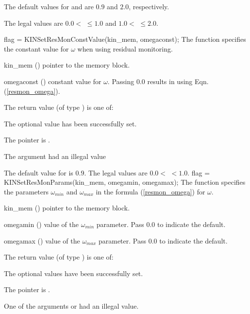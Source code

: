 {
  The default values for  and  are $0.9$ and $2.0$, respectively.

  The legal values are $0.0 <$  $\le 1.0$ and
  $1.0<$  $\le 2.0$.
}
{
flag = KINSetResMonConstValue(kin\_mem, omegaconst);
}
{
  The function  specifies the constant value
  for $\omega$ when using residual monitoring.
}
{
  \begin{args}
  \item[kin\_mem] ()
    pointer to the {\kinsol} memory block.
  \item[omegaconst] ()
    constant value for $\omega$.  Passing $0.0$ results in using
    Eqn. (\ref{resmon_omega}).
  \end{args}
}
{
  The return value  (of type ) is one of:
  \begin{args}
  \item[\Id{KIN\_SUCCESS}]
    The optional value has been successfully set.
  \item[\Id{KIN\_MEM\_NULL}]
    The  pointer is .
  \item[\Id{KIN\_ILL\_INPUT}]
    The argument  had an illegal value
  \end{args}
}
{
  The default value for  is $0.9$.
  The legal values are $0.0 <$  $< 1.0$.
}
{
flag = KINSetResMonParams(kin\_mem, omegamin, omegamax);
}
{
  The function  specifies the parameters $\omega_{min}$ and
  $\omega_{max}$ in the formula (\ref{resmon_omega}) for $\omega$.
}
{
  \begin{args}
  \item[kin\_mem] ()
    pointer to the {\kinsol} memory block.
  \item[omegamin] ()
    value of the $\omega_{min}$ parameter.  Pass $0.0$ to indicate the default.
  \item[omegamax] ()
    value of the $\omega_{max}$ parameter.  Pass $0.0$ to indicate the default.
  \end{args}
}
{
  The return value  (of type ) is one of:
  \begin{args}
  \item[\Id{KIN\_SUCCESS}]
    The optional values have been successfully set.
  \item[\Id{KIN\_MEM\_NULL}]
    The  pointer is .
  \item[\Id{KIN\_ILL\_INPUT}]
    One of the arguments  or  had an illegal value.
  \end{args}
}
